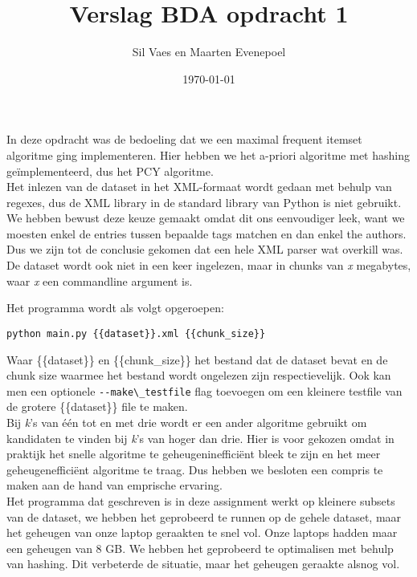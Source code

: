 \documentclass[11pt]{article}
\author{Sil Vaes en Maarten Evenepoel}
\date{\today}
\title{Verslag BDA opdracht 1}
\begin{document}
\maketitle
\setlength\parindent{0pt}

In deze opdracht was de bedoeling dat we een maximal frequent itemset algoritme ging implementeren. Hier hebben we het a-priori algoritme met hashing geïmplementeerd, dus het PCY algoritme.\\


Het inlezen van de dataset in het XML-formaat wordt gedaan met behulp van regexes, dus de XML library in de standard library van Python is niet gebruikt. We hebben bewust deze keuze gemaakt omdat dit ons eenvoudiger leek, want we moesten enkel de entries tussen bepaalde tags matchen en dan enkel the authors. Dus we zijn tot de conclusie gekomen dat een hele XML parser wat overkill was.\\

De dataset wordt ook niet in een keer ingelezen, maar in chunks van \emph{x} megabytes, waar \emph{x} een commandline argument is.

Het programma wordt als volgt opgeroepen:

\begin{verbatim}
python main.py {{dataset}}.xml {{chunk_size}}
\end{verbatim}


Waar \{\{dataset\}\} en \{\{chunk\_size\}\} het bestand dat de dataset bevat en de chunk size waarmee het bestand wordt ongelezen zijn respectievelijk. Ook kan men een optionele \texttt{-{}-make\textbackslash{}\_testfile} flag toevoegen om een kleinere testfile van de grotere \{\{dataset\}\} file te maken.\\

Bij \emph{k}'s van één tot en met drie wordt er een ander algoritme gebruikt om kandidaten te vinden bij \emph{k}'s van hoger dan drie. Hier is voor gekozen omdat in praktijk het snelle algoritme te geheugeninefficiënt bleek te zijn en het meer geheugenefficiënt algoritme te traag. Dus hebben we besloten een compris te maken aan de hand van emprische ervaring.\\

Het programma dat geschreven is in deze assignment werkt op kleinere subsets van de dataset, we hebben het geprobeerd te runnen op de gehele dataset, maar het geheugen van onze laptop geraakten te snel vol. Onze laptops hadden maar een geheugen van 8 GB. We hebben het geprobeerd te optimalisen met behulp van hashing. Dit verbeterde de situatie, maar het geheugen geraakte alsnog vol.\\
\end{document}
